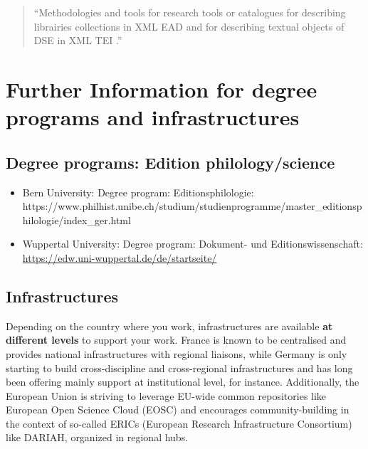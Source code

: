 \documentclass[
  letterpaper,
  DIV=11,
  numbers=noendperiod]{scrreprt}
\begin{document}
\begin{quote}
``Methodologies and tools for research tools or catalogues for
describing librairies collections in XML EAD and for describing textual
objects of DSE in XML TEI .''
\end{quote}

\section{Further Information for degree programs and
infrastructures}\label{further-information-for-degree-programs-and-infrastructures}

\subsection{Degree programs: Edition
philology/science}\label{degree-programs-edition-philologyscience}

\begin{itemize}
\item
  Bern University: Degree program: Editionsphilologie:
  https://www.philhist.unibe.ch/studium/studienprogramme/master\_editionsphilologie/index\_ger.html
\item
  Wuppertal University: Degree program: Dokument- und
  Editionswissenschaft:
  \url{https://edw.uni-wuppertal.de/de/startseite/}
\end{itemize}

\subsection{Infrastructures}\label{infrastructures}

Depending on the country where you work, infrastructures are available
\textbf{at different levels} to support your work. France is known to be
centralised and provides national infrastructures with regional
liaisons, while Germany is only starting to build cross-discipline and
cross-regional infrastructures and has long been offering mainly support
at institutional level, for instance. Additionally, the European Union
is striving to leverage EU-wide common repositories like European Open
Science Cloud (EOSC) and encourages community-building in the context of
so-called ERICs (European Research Infrastructure Consortium) like
DARIAH, organized in regional hubs.
\end{document}
